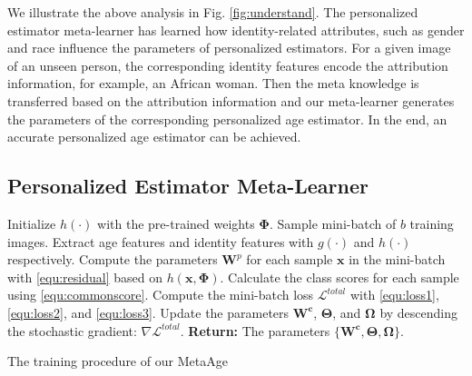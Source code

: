 \documentclass[journal,twoside]{IEEEtran}
\begin{document}
We illustrate the above analysis in Fig. \ref{fig:understand}. The personalized estimator meta-learner has learned how identity-related attributes, such as gender and race influence the parameters of personalized estimators. For a given image of an unseen person, the corresponding identity features encode the attribution information, for example, an African woman. Then the meta knowledge is transferred based on the attribution information and our meta-learner generates the parameters of the corresponding personalized age estimator. In the end, an accurate personalized age estimator can be achieved.






\subsection{Personalized Estimator Meta-Learner}

\begin{algorithm}[t]
	\DontPrintSemicolon
	\SetAlgoLined	
    Initialize $h(\cdot)$ with the pre-trained weights $\bm{\Phi}$.\;
     {
      Sample mini-batch of $b$ training images.\;
      Extract age features and identity features with $g(\cdot)$ and $h(\cdot)$ respectively.\;
      Compute the parameters $\bm{W}^{p}$ for each sample $\bm{x}$ in the mini-batch with \eqref{equ:residual} based on $h(\bm{x},\bm{\Phi})$.\;
      Calculate the class scores for each sample using \eqref{equ:commonscore}.\;
      Compute the mini-batch loss $\mathcal{L}^{total}$ with \eqref{equ:loss1}, \eqref{equ:loss2}, and \eqref{equ:loss3}.\;
      Update the parameters $\bm{W^c}$, $\bm{\Theta}$, and $\bm{\Omega}$ by descending the stochastic gradient: $\nabla \mathcal{L}^{total}$.\;
     }
\textbf{Return:} The parameters $\{\bm{W^c}, \bm{\Theta}, \bm{\Omega}\}$.
\caption{ The training procedure of our MetaAge} \label{alg:pattrain}	
\end{algorithm}
\end{document}
